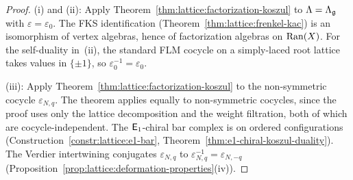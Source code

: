 \begin{proof}
(i) and (ii): Apply Theorem~\ref{thm:lattice:factorization-koszul}
to $\Lambda = \Lambda_{\mathfrak{g}}$ with $\varepsilon = \varepsilon_0$.  The
FKS identification
(Theorem~\ref{thm:lattice:frenkel-kac}) is an isomorphism of vertex
algebras, hence of factorization algebras on $\operatorname{Ran}(X)$.  For the
self-duality in~(ii), the standard FLM cocycle on a simply-laced root
lattice takes values in $\{\pm 1\}$, so
$\varepsilon_0^{-1} = \varepsilon_0$.

(iii): Apply Theorem~\ref{thm:lattice:factorization-koszul} to the
non-symmetric cocycle $\varepsilon_{N,q}$.  The theorem applies
equally to non-symmetric cocycles, since the proof uses only the
lattice decomposition and the weight filtration, both of which are
cocycle-independent.  The $\mathsf{E}_1$-chiral bar complex is on ordered
configurations
(Construction~\ref{constr:lattice:e1-bar},
Theorem~\ref{thm:e1-chiral-koszul-duality}).  The Verdier
intertwining conjugates $\varepsilon_{N,q}$ to
$\varepsilon_{N,q}^{-1} = \varepsilon_{N,-q}$
(Proposition~\ref{prop:lattice:deformation-properties}(iv)).
\end{proof}

